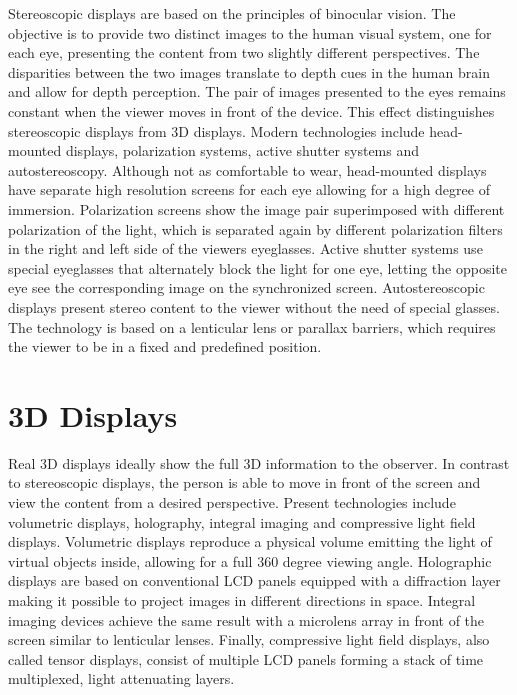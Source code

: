 Stereoscopic displays are based on the principles of binocular vision.
The objective is to provide two distinct images to the human visual system, one for each eye, presenting the content from two slightly different perspectives.
The disparities between the two images translate to depth cues in the human brain and allow for depth perception.
The pair of images presented to the eyes remains constant when the viewer moves in front of the device. 
This effect distinguishes stereoscopic displays from 3D displays.
Modern technologies include head-mounted displays, polarization systems, active shutter systems and autostereoscopy.
Although not as comfortable to wear, head-mounted displays have separate high resolution screens for each eye allowing for a high degree of immersion.
Polarization screens show the image pair superimposed with different polarization of the light, which is separated again by different polarization filters in the right and left side of the viewers eyeglasses.
Active shutter systems use special eyeglasses that alternately block the light for one eye, letting the opposite eye see the corresponding image on the synchronized screen.
Autostereoscopic displays present stereo content to the viewer without the need of special glasses. 
The technology is based on a lenticular lens or parallax barriers, which requires the viewer to be in a fixed and predefined position. 

\section{3D Displays}

Real 3D displays ideally show the full 3D information to the observer.
In contrast to stereoscopic displays, the person is able to move in front of the screen and view the content from a desired perspective.
Present technologies include volumetric displays, holography, integral imaging and compressive light field displays.
Volumetric displays reproduce a physical volume emitting the light of virtual objects inside, allowing for a full 360 degree viewing angle.
Holographic displays are based on conventional LCD panels equipped with a diffraction layer making it possible to project images in different directions in space.
Integral imaging devices achieve the same result with a microlens array in front of the screen similar to lenticular lenses.
Finally, compressive light field displays, also called tensor displays, consist of multiple LCD panels forming a stack of time multiplexed, light attenuating layers.

